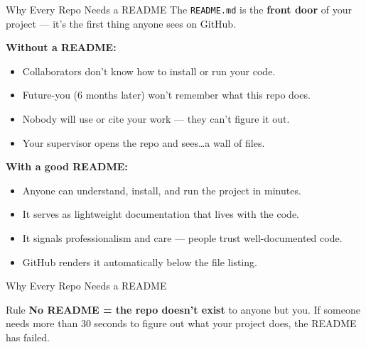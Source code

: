 \documentclass[aspectratio=169, 11pt]{beamer}
\begin{document}
\begin{frame}{Why Every Repo Needs a README}
  The \texttt{README.md} is the \textbf{front door} of your project --- it's the first thing anyone sees on GitHub.

  \vspace{0.3em}
  \textbf{Without a README:}
  \begin{itemize}
    \item Collaborators don't know how to install or run your code.
    \item Future-you (6 months later) won't remember what this repo does.
    \item Nobody will use or cite your work --- they can't figure it out.
    \item Your supervisor opens the repo and sees\ldots a wall of files.
  \end{itemize}

  \vspace{0.3em}
  \textbf{With a good README:}
  \begin{itemize}
    \item Anyone can understand, install, and run the project in minutes.
    \item It serves as lightweight documentation that lives with the code.
    \item It signals professionalism and care --- people trust well-documented code.
    \item GitHub renders it automatically below the file listing.
  \end{itemize}
\end{frame}

\begin{frame}{Why Every Repo Needs a README}
  \vspace{0.3em}
  \begin{alertblock}{Rule}
    \textbf{No README = the repo doesn't exist} to anyone but you. If someone needs more than 30 seconds to figure out what your project does, the README has failed.
  \end{alertblock}
\end{frame}
\end{document}
